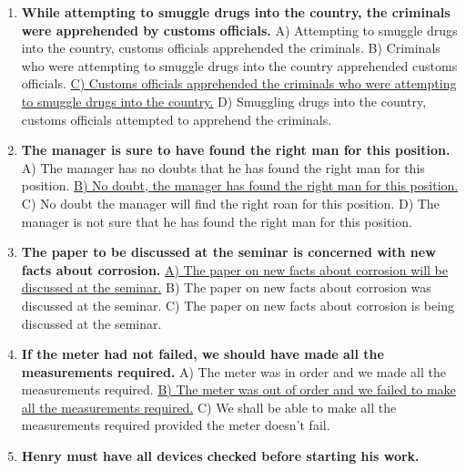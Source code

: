 \documentclass[main.tex]{subfiles}
\begin{document}
\begin{enumerate}[nosep, leftmargin=*]
	\item \textbf{While attempting to smuggle drugs into the country, the criminals were apprehended by customs officials.}\newline
		A) Attempting to smuggle drugs into the country, customs officials apprehended the criminals.\newline
		B) Criminals who were attempting to smuggle drugs into the country apprehended customs officials.\newline
		\uline{C) Customs officials apprehended the criminals who were attempting to smuggle drugs into the country.}\newline
		D) Smuggling drugs into the country, customs officials attempted to apprehend the criminals.
	\item \textbf{The manager is sure to have found the right man for this position.}\newline
		A) The manager has no doubts that he has found the right man for this position.\newline
		\uline{B) No doubt, the manager has found the right man for this position.}\newline
		C) No doubt the manager will find the right roan for this position.\newline
		D) The manager is not sure that he has found the right man for this position.
	\item \textbf{The paper to be discussed at the seminar is concerned with new facts about corrosion.}\newline
		\uline{A) The paper on new facts about corrosion will be discussed at the seminar.}\newline
		B) The paper on new facts about corrosion was discussed at the seminar.\newline
		C) The paper on new facts about corrosion is being discussed at the seminar.
	\item \textbf{If the meter had not failed, we should have made all the measurements required.}\newline
		A) The meter was in order and we made all the measurements required.\newline
		\uline{B) The meter was out of order and we failed to make all the measurements required.}\newline
		C) We shall be able to make all the measurements required provided the meter doesn't fail.
	\item \textbf{Henry must have all devices checked before starting his work.}\newline

\end{enumerate}
\end{document}
